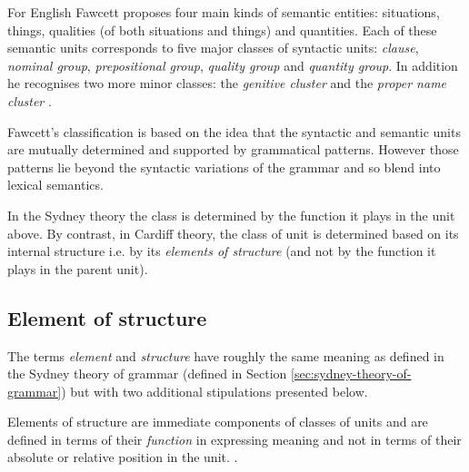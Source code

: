 For English Fawcett proposes four main kinds of semantic entities: situations, things, qualities (of both situations and things) and quantities. Each of these semantic units corresponds to five major classes of syntactic units: \textit{clause}, \textit{nominal group}, \textit{prepositional group}, \textit{quality group} and \textit{quantity group}. In addition he recognises two more minor classes: the \textit{genitive cluster} and the \textit{proper name cluster} \citep[193--194]{Fawcett2000}. 


Fawcett's classification is based on the idea that the syntactic and semantic units are mutually determined and supported by grammatical patterns. However those patterns lie beyond the syntactic variations of the grammar and so blend into lexical semantics.

In the Sydney theory the class is determined by the function it plays in the unit above. By contrast, in Cardiff theory, the class of unit is determined based on its internal structure i.e. by its \textit{elements of structure} (and not by the function it plays in the parent unit).  

\subsection{Element of structure}
\label{sec:elements-of-structure}

The terms \textit{element} and \textit{structure} have roughly the same meaning as defined in the Sydney theory of grammar (defined in Section \ref{sec:sydney-theory-of-grammar}) but with two additional stipulations presented below.

\begin{definition}\label{def:elementStructure}
	Elements of structure are immediate components of classes of units and are defined in terms of their \textit{function} in expressing meaning and not in terms of their absolute or relative position in the unit. \citep[213--214]{Fawcett2000}. 
\end{definition}

